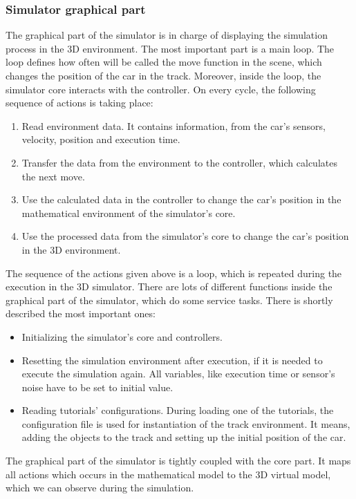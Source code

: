 \subsubsection{Simulator graphical part}
The graphical part of the simulator is in charge of displaying the simulation process in the 3D environment. The most important part is a main loop. The loop defines how often will be called the move function in the scene, which changes the position of the car in the track. Moreover, inside the loop, the simulator core interacts with the controller. On every cycle, the following sequence of actions is taking place:
\begin{enumerate}
    \item Read environment data. It contains information, from the car's sensors, velocity, position and execution time.
    \item Transfer the data from the environment to the controller, which calculates the next move.
    \item Use the calculated data in the controller to change the car's position in the mathematical environment of the simulator's core.
    \item Use the processed data from the simulator's core to change the car's position in the 3D environment.
\end{enumerate}
The sequence of the actions given above is a loop, which is repeated during the execution in the 3D simulator. There are lots of different functions inside the graphical part of the simulator, which do some service tasks. There is shortly described the most important ones:
\begin{itemize}
    \item Initializing the simulator's core and controllers.
    \item Resetting the simulation environment after execution, if it is needed to execute the simulation again. All variables, like execution time or sensor's noise have to be set to initial value.
    \item Reading tutorials' configurations. During loading one of the tutorials, the configuration file is used for instantiation of the track environment. It means, adding the objects to the track and setting up the initial position of the car.
\end{itemize}
The graphical part of the simulator is tightly coupled with the core part. It maps all actions which occurs in the mathematical model to the 3D virtual model, which we can observe during the simulation. 

